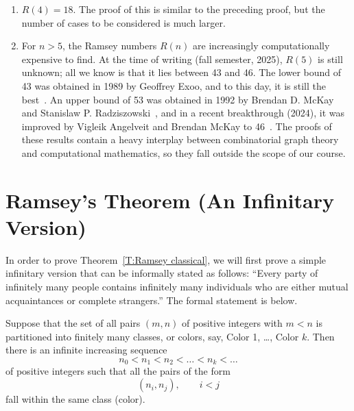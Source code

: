 \begin{examples}
\begin{enumerate}
\begin{figure}[h!]
\end{figure}

\item
$R(4)=18$. The proof of this is similar to the preceding proof, but the number of cases to  be considered is much larger.

\item
For $n>5$, the Ramsey numbers $R(n)$ are increasingly computationally expensive to find. At the time of writing (fall semester, 2025), $R(5)$ is still unknown; all we know is that it lies between 43 and 46. The lower bound of 43 was obtained in 1989 by Geoffrey Exoo, and to this day, it is still the best~\cite{Exoo:1989}. An upper bound of 53 was obtained in 1992 by Brendan D. McKay and Stanislaw P. Radziszowski~\cite{McKay-Radziszowski:1992}, and in a recent breakthrough (2024), it was improved by  Vigleik Angelveit and Brendan McKay to 46~\cite{Angeltveit-McKay}. The proofs of these results contain a heavy interplay between combinatorial graph theory and computational mathematics, so they fall outside the scope of our course.
\end{enumerate}
\end{examples} 

\section{Ramsey's Theorem (An Infinitary Version)}


In order to prove Theorem~\ref{T:Ramsey classical}, we will first prove a simple infinitary version that can be informally stated as follows: ``Every party of infinitely many people contains infinitely many individuals who are either mutual acquaintances  or complete strangers.'' The formal statement is below.


\begin{theorem}
\label{T:Ramsey infinitary}
Suppose that the set of all pairs $(m,n)$ of positive integers with $m<n$ is partitioned into finitely many classes, or colors, say, Color 1, \dots,  Color $k$. Then there is an infinite  increasing sequence
\[
n_0 < n_1 < n_2<\dots < n_k<\dots
\]
of positive integers such that all the pairs of the form
\[
(n_i, n_j),\qquad
i<j
\]
fall within the same class (color).
\end{theorem}

